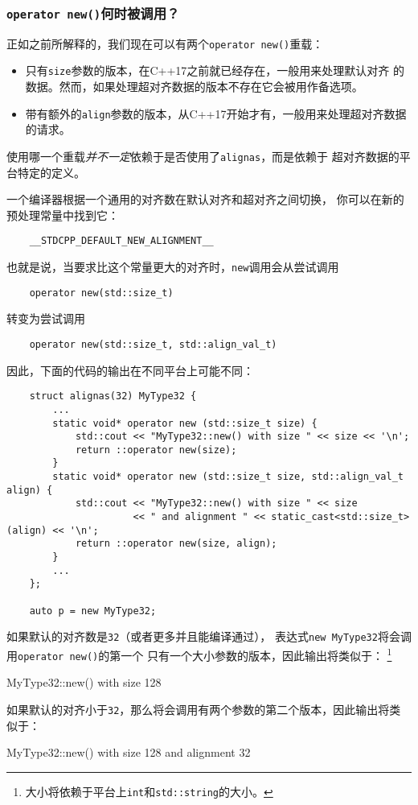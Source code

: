\subsubsection{\texttt{operator new()}何时被调用？}\label{ch30.2.2.1}
正如之前所解释的，我们现在可以有两个\texttt{operator new()}重载：
\begin{itemize}
    \item 只有\texttt{size}参数的版本，在C++17之前就已经存在，一般用来处理默认对齐
    的数据。然而，如果处理超对齐数据的版本不存在它会被用作备选项。
    \item 带有额外的\texttt{align}参数的版本，从C++17开始才有，一般用来处理超对齐数据的请求。
\end{itemize}
使用哪一个重载\emph{并不一定}依赖于是否使用了\texttt{alignas}，而是依赖于
超对齐数据的平台特定的定义。

一个编译器根据一个通用的对齐数在默认对齐和超对齐之间切换，
你可以在新的预处理常量中找到它：
\begin{lstlisting}
    __STDCPP_DEFAULT_NEW_ALIGNMENT__
\end{lstlisting}
也就是说，当要求比这个常量更大的对齐时，\texttt{new}调用会从尝试调用
\begin{lstlisting}
    operator new(std::size_t)
\end{lstlisting}
转变为尝试调用
\begin{lstlisting}
    operator new(std::size_t, std::align_val_t)
\end{lstlisting}
因此，下面的代码的输出在不同平台上可能不同：
\begin{lstlisting}
    struct alignas(32) MyType32 {
        ...
        static void* operator new (std::size_t size) {
            std::cout << "MyType32::new() with size " << size << '\n';
            return ::operator new(size);
        }
        static void* operator new (std::size_t size, std::align_val_t align) {
            std::cout << "MyType32::new() with size " << size
                      << " and alignment " << static_cast<std::size_t>(align) << '\n';
            return ::operator new(size, align);
        }
        ...
    };

    auto p = new MyType32;
\end{lstlisting}
如果默认的对齐数是\texttt{32}（或者更多并且能编译通过），
表达式\texttt{new MyType32}将会调用\texttt{operator new()}的第一个
只有一个大小参数的版本，因此输出将类似于：
\footnote{大小将依赖于平台上\texttt{int}和\texttt{std::string}的大小。}
\begin{blacklisting}
    MyType32::new() with size 128
\end{blacklisting}
如果默认的对齐小于\texttt{32}，那么将会调用有两个参数的第二个版本，因此输出将类似于：
\begin{blacklisting}
    MyType32::new() with size 128 and alignment 32
\end{blacklisting}


